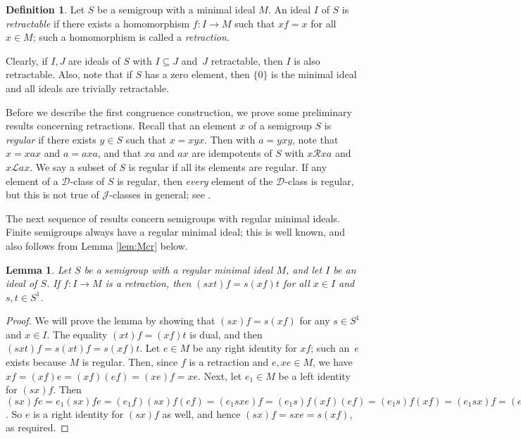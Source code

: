 \documentclass[11pt,a4paper]{article}
\renewcommand{\L}{\mathrel{\mathscr L}}
\newcommand{\R}{\mathrel{\mathscr R}}
\newcommand{\D}{\mathrel{\mathscr D}}
\newcommand{\gJ}{\mathrel{\mathscr J}}
\newcommand{\1}{\id_n}
\newcommand{\sub}{\subseteq}
\newcommand{\pf}{\begin{proof}}
\newcommand{\epf}{\end{proof}}
\numberwithin{equation}{section}
\newtheorem{lemma}[equation]{Lemma}
\theoremstyle{definition}
\newtheorem{defn}[equation]{Definition}
\begin{document}
\begin{defn}\label{defn:retractable}
  Let $S$ be a semigroup with a minimal ideal $M$.  An ideal $I$ of $S$ is \textit{retractable} if there exists a
  homomorphism $f: I \to M$ such that $xf = x$ for all $x\in M$; such a
  homomorphism is called a \textit{retraction}. 
\end{defn}

Clearly, if $I,J$ are ideals of $S$ with $I\sub J$ and~$J$ retractable, then $I$ is also retractable.  Also, note that if $S$ has a zero element, then $\{0\}$ is the minimal ideal and all ideals are trivially retractable.

Before we describe the first congruence construction, we prove some preliminary results concerning retractions.  
%
Recall that an element $x$ of a semigroup $S$ is \emph{regular} if there exists $y\in S$ such that $x=xyx$.  Then with $a=yxy$, note that $x=xax$ and $a=axa$, and that $xa$ and $ax$ are idempotents of $S$ with $x\R xa$ and $x\L ax$.  We say a subset of $S$ is regular if all its elements are regular.  If any element of a $\D$-class of $S$ is regular, then \emph{every} element of the $\D$-class is regular, but this is not true of $\gJ$-classes in general; see \cite[Proposition 2.3.1]{Howie}.

The next sequence of results concern semigroups with regular minimal ideals.  Finite semigroups always have a regular minimal ideal; this is well known, and also follows from Lemma \ref{lem:Mcr} below.  




\begin{lemma}
\label{lemma-RetractAux}
Let $S$ be a semigroup with a regular minimal ideal $M$, and let $I$ be an ideal of $S$. If $f: I\rightarrow M$ is a retraction, then $(sxt)f=s(xf)t$ for all $x\in I$ and $s,t\in S^1$.
\end{lemma}

\pf
We will prove the lemma by showing that $(sx)f=s(xf)$ for any $s\in S ^ 1$ and
$x\in I$.  The equality $(xt)f=(xf)t$ is dual, and then $(sxt)f=s(xt)f=s(xf)t$.
Let $e\in M$ be any right identity for $xf$; such an~$e$ exists because $M$
is regular. Then, since $f$ is a retraction and $e,xe\in M$, we have
$xf=(xf)e=(xf)(ef)=(xe)f=xe$.  Next, let $e_1\in M$ be a left identity for
$(sx)f$.  Then
$
(sx)fe=e_1(sx)fe=(e_1f)(sx)f(ef)=(e_1sxe)f=(e_1s)f(xf)(ef)=(e_1s)f(xf)=(e_1sx)f=(e_1f)(sx)f=e_1(sx)f=(sx)f
$.
So $e$ is a right identity for $(sx)f$ as well, and hence $(sx)f=sxe=s(xf)$, as
required.
\epf
\end{document}

